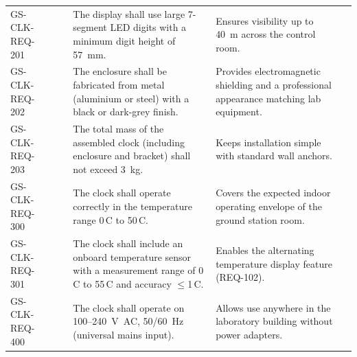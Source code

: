 \begin{landscape}
\begin{longtable}{C{3.5cm} C{2.4cm} C{1.7cm} L{8.5cm} L{5.7cm} C{2.5cm}}
    GS-CLK-REQ-201 &  & 
        & The display shall use large 7-segment LED digits with a minimum digit height of 57~mm.
        & Ensures visibility up to 40~m across the control room.
        &  \\[2pt]

    GS-CLK-REQ-202 &  & 
        & The enclosure shall be fabricated from metal (aluminium or steel) with a black or dark-grey finish.
        & Provides electromagnetic shielding and a professional appearance matching lab equipment.
        &  \\[2pt]

    GS-CLK-REQ-203 &  & 
        & The total mass of the assembled clock (including enclosure and bracket) shall not exceed 3~kg.
        & Keeps installation simple with standard wall anchors.
        &  \\[2pt]

    GS-CLK-REQ-300 &  & 
        & The clock shall operate correctly in the temperature range 0\,\textdegree{}C to 50\,\textdegree{}C.
        & Covers the expected indoor operating envelope of the ground station room.
        &  \\[2pt]

    GS-CLK-REQ-301 &  & 
        & The clock shall include an onboard temperature sensor with a
        measurement range of $0$\,\textdegree{}C to 55\,\textdegree{}C and accuracy $\leq$1\,\textdegree{}C.
        & Enables the alternating temperature display feature (REQ-102).
        &  \\[2pt]

    GS-CLK-REQ-400 &  & 
        & The clock shall operate on 100--240~V~AC, 50/60~Hz (universal mains input).
        & Allows use anywhere in the laboratory building without power adapters.
        &  \\[2pt]


\end{longtable}
\end{landscape}
